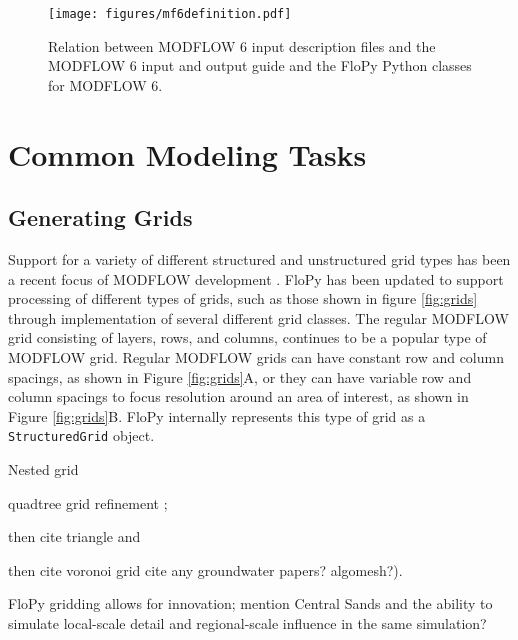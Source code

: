 \documentclass[11pt, oneside]{article}   	%
\begin{document}
\begin{figure}[ht!]
	\begin{center}
		\texttt{[image: figures/mf6definition.pdf]}
	\end{center}
	\caption{Relation between MODFLOW 6 input description files and the MODFLOW 6 input and output guide and the FloPy Python classes for MODFLOW 6.}
	\label{fig:mf6definition}
\end{figure}

\section{Common Modeling Tasks}

\subsection{Generating Grids}

Support for a variety of different structured and unstructured grid types has been a recent focus of MODFLOW development \citep{modflowusg, modflow6gwf, modflow6xt3d}.  FloPy has been updated to support processing of different types of grids, such as those shown in figure \ref{fig:grids} through implementation of several different grid classes.  The regular MODFLOW grid consisting of layers, rows, and columns, continues to be a popular type of MODFLOW grid.  Regular MODFLOW grids can have constant row and column spacings, as shown in Figure \ref{fig:grids}A, or they can have variable row and column spacings to focus resolution around an area of interest, as shown in Figure \ref{fig:grids}B.  FloPy internally represents this type of grid as a \texttt{StructuredGrid} object.  

Nested grid \citep{modflowlgr2}

quadtree grid refinement \citep{gridgen}; 

then cite triangle \citep{trianglemesh} and 

then cite voronoi grid \citep{2020SciPy-NMeth} cite any groundwater papers? algomesh?).

FloPy gridding allows for innovation; mention Central Sands and the ability to simulate local-scale detail and regional-scale influence in the same simulation?
\end{document}
